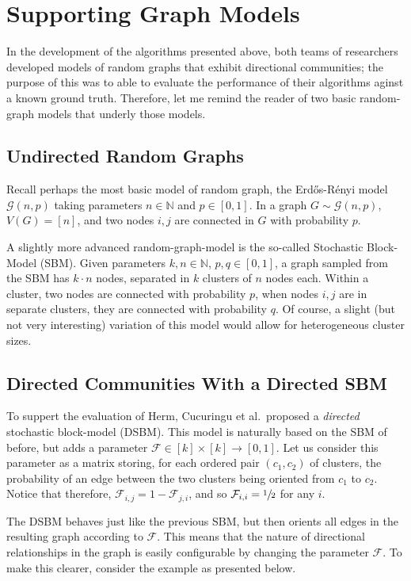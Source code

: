 \section{Supporting Graph Models}

In the development of the algorithms presented above, both teams of researchers developed models of
random graphs that exhibit directional communities; the purpose of this was to able to evaluate 
the performance of their algorithms aginst a known ground truth. Therefore, let me remind the reader
of two basic random-graph models that underly those models.

\subsection{Undirected Random Graphs}

Recall perhaps the most basic model of random graph, the Erd\H{o}s-R\'enyi model $\mathcal{G}(n,p)$ 
taking parameters $n \in \mathbb{N}$ and $p \in [0, 1]$. In a graph $G \sim \mathcal{G}(n,p)$, 
$V(G) = [n]$, and two nodes $i,j$ are connected in $G$ with probability $p$.

A slightly more advanced random-graph-model is the so-called Stochastic Block-Model (SBM). Given
parameters $k, n \in \mathbb{N}$, $p, q \in [0,1]$, a graph sampled from the SBM has $k \cdot n$
nodes, separated in $k$ clusters of $n$ nodes each. Within a cluster, two nodes are connected with
probability $p$, when nodes $i, j$ are in separate clusters, they are connected with probability 
$q$. Of course, a slight (but not very interesting) variation of this model would allow for 
heterogeneous cluster sizes. 

\subsection{Directed Communities With a Directed SBM}

To suppert the evaluation of Herm, Cucuringu et al.\ proposed a \emph{directed} stochastic 
block-model (DSBM). This model is naturally based on the SBM of before, but adds a parameter $\mathcal{F}
\in [k] \times [k] \rightarrow [0,1]$. Let us consider this parameter as a matrix storing, for each
ordered pair $(c_1, c_2)$ of clusters, the probability of an edge between the two clusters being 
oriented from $c_1$ to $c_2$. Notice that therefore, $\mathcal{F}_{i,j} = 1-\mathcal{F}_{j,i}$, and
so $\mathcal{F}_{i,i} = \sfrac{1}{2}$ for any $i$.

The DSBM behaves just like the previous SBM, but then orients all edges in the resulting graph 
according to $\mathcal{F}$. This means that the nature of directional relationships in the graph
is easily configurable by changing the parameter $\mathcal{F}$. To make this clearer, consider the 
example as presented below.

